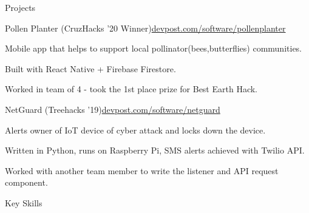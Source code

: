 \documentclass{resume} %
\begin{document}

\begin{rSection}{Projects}

    \begin{rSubsection}{Pollen Planter (CruzHacks '20 Winner)}{\href{https://www.devpost.com/software/pollenplanter}{devpost.com/software/pollenplanter}}{}{}
        \item Mobile app that helps to support local pollinator(bees,butterflies) communities.
        \item Built with React Native + Firebase Firestore.
        \item Worked in team of 4 - took the 1st place prize for Best Earth Hack.
    \end{rSubsection}

    \begin{rSubsection}{NetGuard (Treehacks '19)}{\href{https://www.devpost.com/software/netguard}{devpost.com/software/netguard}}{}{}
        \item Alerts owner of IoT device of cyber attack and locks down the device.
        \item Written in Python, runs on Raspberry Pi, SMS alerts achieved with Twilio API.
        \item Worked with another team member to write the listener and API request component.
    \end{rSubsection}

\end{rSection}

\begin{rSection}{Key Skills}

\end{rSection}






\end{document}
